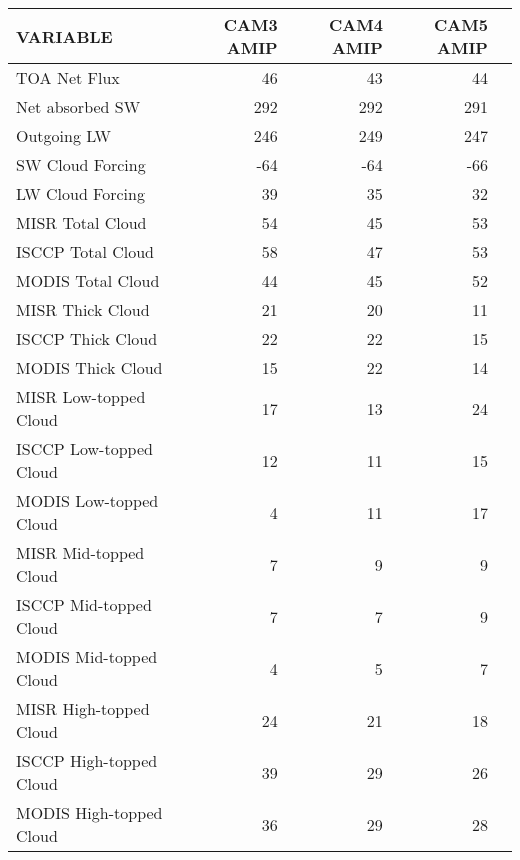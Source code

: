 \begin{tabular}{lrrrr}
\hline
                VARIABLE &                CAM3 AMIP &                CAM4 AMIP &                CAM5 AMIP \\ \hline
            TOA Net Flux &                       46 &                       43 &                       44 \\
         Net absorbed SW &                      292 &                      292 &                      291 \\
             Outgoing LW &                      246 &                      249 &                      247 \\
        SW Cloud Forcing &                      -64 &                      -64 &                      -66 \\
        LW Cloud Forcing &                       39 &                       35 &                       32 \\
        MISR Total Cloud &                       54 &                       45 &                       53 \\
       ISCCP Total Cloud &                       58 &                       47 &                       53 \\
       MODIS Total Cloud &                       44 &                       45 &                       52 \\
        MISR Thick Cloud &                       21 &                       20 &                       11 \\
       ISCCP Thick Cloud &                       22 &                       22 &                       15 \\
       MODIS Thick Cloud &                       15 &                       22 &                       14 \\
   MISR Low-topped Cloud &                       17 &                       13 &                       24 \\
  ISCCP Low-topped Cloud &                       12 &                       11 &                       15 \\
  MODIS Low-topped Cloud &                        4 &                       11 &                       17 \\
   MISR Mid-topped Cloud &                        7 &                        9 &                        9 \\
  ISCCP Mid-topped Cloud &                        7 &                        7 &                        9 \\
  MODIS Mid-topped Cloud &                        4 &                        5 &                        7 \\
  MISR High-topped Cloud &                       24 &                       21 &                       18 \\
 ISCCP High-topped Cloud &                       39 &                       29 &                       26 \\
 MODIS High-topped Cloud &                       36 &                       29 &                       28 \\ \hline
\end{tabular}
